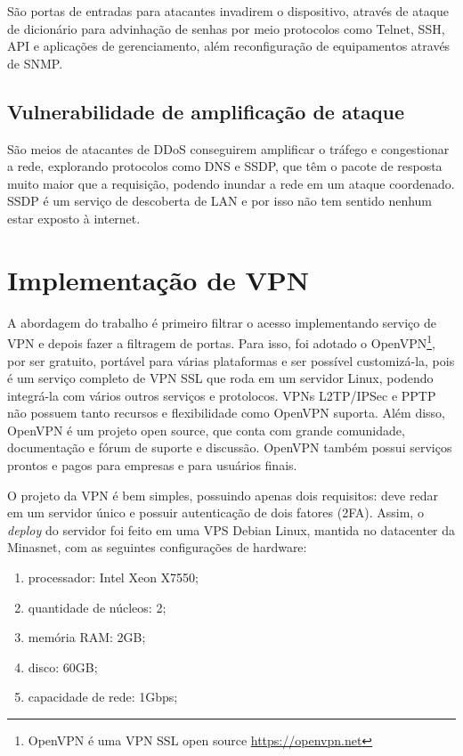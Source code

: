     São portas de entradas para atacantes invadirem o dispositivo, através de ataque de dicionário para advinhação de senhas por meio protocolos como Telnet, SSH, API e aplicações de gerenciamento, além reconfiguração de equipamentos através de SNMP.

\subsection{Vulnerabilidade de amplificação de ataque}

    São meios de atacantes de DDoS conseguirem amplificar o tráfego e congestionar a rede, explorando protocolos como DNS e SSDP, que têm o pacote de resposta muito maior que a requisição, podendo inundar a rede em um ataque coordenado. SSDP é um serviço de descoberta de LAN e por isso não tem sentido nenhum estar exposto à internet.

\section{Implementação de VPN}

    A abordagem do trabalho é primeiro filtrar o acesso implementando serviço de VPN e depois fazer a filtragem de portas. Para isso, foi adotado o OpenVPN\footnote{OpenVPN é uma VPN SSL open source \url{https://openvpn.net}}, por ser gratuito, portável para várias plataformas e ser possível customizá-la, pois é um serviço completo de VPN SSL que roda em um servidor Linux, podendo integrá-la com vários outros serviços e protolocos. VPNs L2TP/IPSec e PPTP não possuem tanto recursos e flexibilidade como OpenVPN suporta. Além disso, OpenVPN é um projeto open source, que conta com grande comunidade, documentação e fórum de suporte e discussão. OpenVPN também possui serviços prontos e pagos para empresas e para usuários finais.
    
    O projeto da VPN é bem simples, possuindo apenas dois requisitos: deve redar em um servidor único e possuir autenticação de dois fatores (2FA). Assim, o \textit{deploy} do servidor foi feito em uma VPS Debian Linux, mantida no datacenter da Minasnet, com as seguintes configurações de hardware:
    
    \begin{enumerate}[label=\alph*)]
        \item processador: Intel Xeon X7550;
        \item quantidade de núcleos: 2;
        \item memória RAM: 2GB;
        \item disco: 60GB;
        \item capacidade de rede: 1Gbps;
    \end{enumerate}
    

